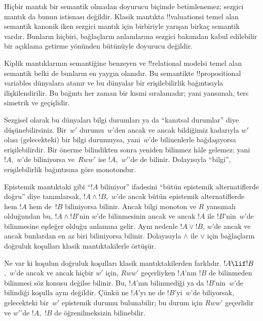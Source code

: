 



Hiçbir mantık bir semantik olmadan doyurucu biçimde betimlenemez; sezgici
mantık da bunun istisnası değildir. Klasik mantıkta !!{valuation}s{}i temel alan
semantik kanonik iken sezgici mantık için birbiriyle yarışan birkaç semantik
vardır. Bunların hiçbiri, bağlaçların anlamlarına sezgici bakımdan kabul
edilebilir bir açıklama getirme yönünden bütünüyle doyurucu değildir.

Kiplik mantıklarının semantiğine benzeyen ve !!{relational model}s{}i temel alan
semantik belki de bunların en yaygın olanıdır. Bu semantikte
!!{propositional variable}s dünyalara atanır ve bu dünyalar bir erişilebilirlik
bağıntısıyla ilişkilendirilir. Bu bağıntı her zaman bir kısmi sıralamadır; yani
yansımalı, ters simetrik ve geçişlidir.

Sezgisel olarak bu dünyaları bilgi durumları ya da ``kanıtsal durumlar'' diye
düşünebilirsiniz. Bir~$w'$ durumu~$w$'den ancak ve ancak bildiğimiz kadarıyla
$w'$ olası (gelecekteki) bir bilgi durumuysa, yani~$w$'de bilinenlerle
bağdaşıyorsa erişilebilirdir. Bir önerme bilindikten sonra yeniden bilinmez
hâle gelemez; yani $!A$,~$w$'de biliniyorsa ve~$Rww'$ ise $!A$,~$w'$'de de
bilinir. Dolayısıyla ``bilgi'', erişilebilirlik bağıntısına göre monotondur.

Epistemik mantıktaki gibi ``$!A$ biliniyor'' ifadesini ``bütün epistemik
alternatiflerde doğru'' diye tanımlarsak, $!A \land !B$,~$w$'de ancak bütün
epistemik alternatiflerde hem $!A$ hem de~$!B$ biliniyorsa bilinir. Ancak bilgi
monoton ve $R$ yansımalı olduğundan bu, $!A \land !B$'nin $w$'de bilinmesinin
ancak ve ancak $!A$ ile $!B$'nin~$w$'de bilinmesine eşdeğer olduğu anlamına
gelir. Aynı nedenle
$!A \lor !B$, $w$'de ancak ve ancak bunlardan en az biri biliniyorsa bilinir.
Dolayısıyla $\land$ ile $\lor$ için bağlaçların doğruluk koşulları klasik
mantıktakilerle örtüşür.

Ne var ki koşulun doğruluk koşulları klasik mantıktakilerden farklıdır. $!A
\lif !B$,~$w$'de ancak ve ancak hiçbir $w'$ için, $Rww'$ geçerliyken $!A$'nın
$!B$ de bilinmeden bilinmesi söz konusu değilse bilinir. Bu, $!A$'nın bilinmediği ya da $!B$'nin~$w$'de
bilindiği koşulla aynı değildir. Çünkü ne $!A$'yı ne de $!B$'yi~$w$'de
biliyorsak, gelecekteki bir~$w'$ epistemik durumu bulunabilir; bu durum için
$Rww'$ geçerlidir ve $w'$'de $!A$,~$!B$ de öğrenilmeksizin bilinebilir.


